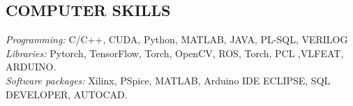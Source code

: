 \documentclass[7pt]{article}
\begin{document}
\begin{small}
\section{COMPUTER SKILLS} 
{\sl Programming:}        C/C++, CUDA, Python, MATLAB, JAVA, PL-SQL, VERILOG\\
{\sl Libraries:        }      Pytorch, TensorFlow, Torch, OpenCV, ROS, Torch, PCL ,VLFEAT, ARDUINO.\\
{\sl Software packages: } Xilinx, PSpice, MATLAB, Arduino IDE
                       ECLIPSE, SQL DEVELOPER, AUTOCAD.\\
 



\vspace{-4 mm}


\end{small}
\end{document}
